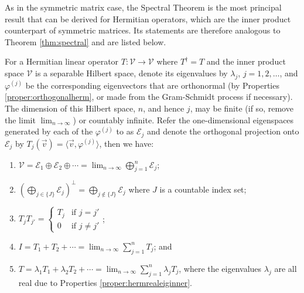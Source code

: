 As in the symmetric matrix case, the Spectral Theorem is the most principal result that can be derived for Hermitian operators, which are the inner product counterpart of symmetric matrices. Its statements are therefore analogous to Theorem \ref{thm:spectral} and are listed below.
\begin{thm}
\label{thm:spectralinner}
For a Hermitian linear operator $T: \mathcal{V} \to \mathcal{V}$ where $T^\dag = T$ and the inner product space $\mathcal{V}$ is a separable Hilbert space, denote its eigenvalues by $\lambda_j$, $j = 1,2,\ldots$, and $\varphi^{(j)}$ be the corresponding eigenvectors that are orthonormal (by Properties \ref{proper:orthogonalherm}, or made from the Gram-Schmidt process if necessary). The dimension of this Hilbert space, $n$, and hence $j$, may be finite (if so, remove the limit $\lim_{n \to \infty}$) or countably infinite. Refer the one-dimensional eigenspaces generated by each of the $\varphi^{(j)}$ to as $\mathcal{E}_{j}$ and denote the orthogonal projection onto $\mathcal{E}_{j}$ by $T_{j}(\vec{v}) = \langle \vec{v} , \varphi^{(j)} \rangle$, then we have:
\begin{enumerate}[label=(\alph*)]
\item $\mathcal{V} = \mathcal{E}_{1} \oplus \mathcal{E}_{2} \oplus \cdots = \lim_{n \to \infty} \bigoplus_{j=1}^{n} \mathcal{E}_{j}$;
\item $(\bigoplus_{j \in \{J\}} \mathcal{E}_{j})^\perp = \bigoplus_{j \notin \{J\}} \mathcal{E}_{j}$ where $J$ is a countable index set;
\item $T_{j} T_{j'} = 
\begin{cases}
T_{j} & \text{if $j = j'$} \\
0 & \text{if $j \neq j'$}
\end{cases}$;
\item $I = T_{1} + T_{2} + \cdots = \lim_{n \to \infty} \sum_{j=1}^{n} T_{j}$; and
\item $T = \lambda_{1}T_{1} + \lambda_{2}T_{2} + \cdots = \lim_{n \to \infty} \sum_{j=1}^{n} \lambda_{j}T_{j}$, where the eigenvalues $\lambda_j$ are all real due to Properties \ref{proper:hermrealeiginner}.
\end{enumerate}
\end{thm}
